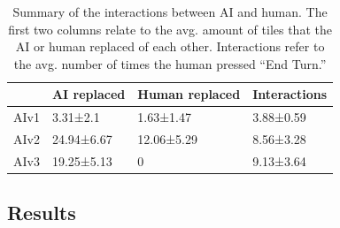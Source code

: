 \begin{table}[]
\centering
\begin{tabular}{|l|lll|}
\hline
     & AI replaced & Human replaced & Interactions \\ \hline
AIv1 & 3.31±2.1     & 1.63±1.47       & 3.88±0.59    \\
AIv2 & 24.94±6.67   & 12.06±5.29      & 8.56±3.28    \\
AIv3 & 19.25±5.13   & 0               & 9.13±3.64    \\ \hline
\end{tabular}%
\caption{Summary of the interactions between AI and human. The first two columns relate to the avg. amount of tiles that the AI or human replaced of each other. Interactions refer to the avg. number of times the human pressed ``End Turn.''}
\label{tab:humanai-interactions}
\end{table}



\subsection{Results}



